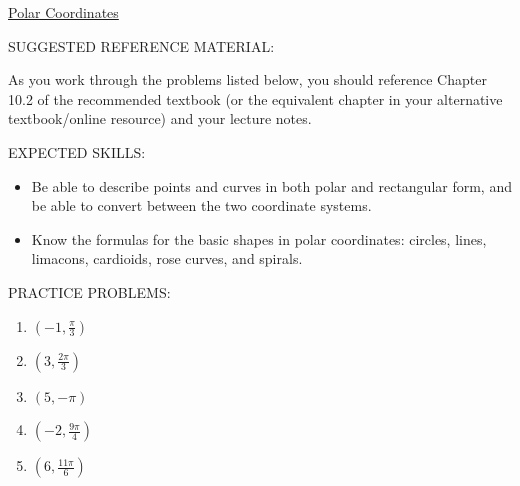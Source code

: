 \documentclass[12pt]{article}
\newif\ifans
\begin{document}
\begin{center}
\underline{\LARGE{Polar Coordinates}}
\end{center}

\noindent SUGGESTED REFERENCE MATERIAL:

\bigskip

\noindent As you work through the problems listed below, you should reference Chapter 10.2 of the recommended textbook (or the equivalent chapter in your alternative textbook/online resource) and your lecture notes.

\bigskip

\noindent EXPECTED SKILLS:

\begin{itemize}

\item Be able to describe points and curves in both polar and rectangular form, and be able to convert between the two coordinate systems. 

\item Know the formulas for the basic shapes in polar coordinates: circles, lines, limacons, cardioids, rose curves,
and spirals.

\end{itemize}

\noindent PRACTICE PROBLEMS:

\medskip


\begin{enumerate}

\item $\left(-1, \frac{\pi}{3}\right)$ 

\ifans{\fbox{$\left(-\frac{1}{2},-\frac{\sqrt{3}}{2}\right)$}} \fi

\item $\left(3, \frac{2\pi}{3}\right)$ 

\ifans{\fbox{$\left(-\frac{3}{2},\frac{3\sqrt{3}}{2}\right)$}} \fi

\item $(5, -\pi)$ 

\ifans{\fbox{$(-5,0)$}} \fi

\item $\left(-2, \frac{9\pi}{4}\right)$ 

\ifans{\fbox{$\left(-\sqrt{2},-\sqrt{2}\right)$}} \fi

\item $\left(6, \frac{11\pi}{6}\right)$ 

\ifans{\fbox{$\left(3\sqrt{3},-3\right)$}} \fi

\end{enumerate}
\end{document}
